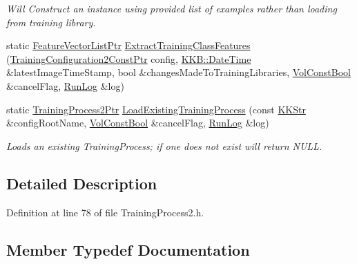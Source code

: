 \begin{DoxyCompactItemize}
\begin{DoxyCompactList}\small\item\em Will Construct an instance using provided list of examples rather than loading from training library. \end{DoxyCompactList}\item 
static \hyperlink{namespace_k_k_m_l_l_acf2ba92a3cf03e2b19674b24ff488ef6}{Feature\+Vector\+List\+Ptr} \hyperlink{class_k_k_m_l_l_1_1_training_process2_aa1f7422d93e5db2d5f540d657b14720f}{Extract\+Training\+Class\+Features} (\hyperlink{namespace_k_k_m_l_l_a7f2af9b6e9a0f9d0ac33c66c0856de35}{Training\+Configuration2\+Const\+Ptr} config, \hyperlink{class_k_k_b_1_1_date_time}{K\+K\+B\+::\+Date\+Time} \&latest\+Image\+Time\+Stamp, bool \&changes\+Made\+To\+Training\+Libraries, \hyperlink{namespace_k_k_b_a7d390f568e2831fb76b86b56c87bf92f}{Vol\+Const\+Bool} \&cancel\+Flag, \hyperlink{class_k_k_b_1_1_run_log}{Run\+Log} \&log)
\item 
static \hyperlink{class_k_k_m_l_l_1_1_training_process2_a5442e76e1ae2de2e77e3a36b55f98fe4}{Training\+Process2\+Ptr} \hyperlink{class_k_k_m_l_l_1_1_training_process2_acb1e01bb8bae43fda6fa37136766aacc}{Load\+Existing\+Training\+Process} (const \hyperlink{class_k_k_b_1_1_k_k_str}{K\+K\+Str} \&config\+Root\+Name, \hyperlink{namespace_k_k_b_a7d390f568e2831fb76b86b56c87bf92f}{Vol\+Const\+Bool} \&cancel\+Flag, \hyperlink{class_k_k_b_1_1_run_log}{Run\+Log} \&log)
\begin{DoxyCompactList}\small\item\em Loads an existing Training\+Process; if one does not exist will return N\+U\+LL. \end{DoxyCompactList}\end{DoxyCompactItemize}


\subsection{Detailed Description}


Definition at line 78 of file Training\+Process2.\+h.



\subsection{Member Typedef Documentation}
